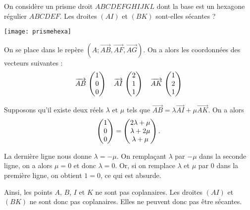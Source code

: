 \documentclass[11pt,fleqn, openany]{book} %
\begin{document}
\begin{exercise}[topic=geo05]On considère un prisme droit $ABCDEFGHIJKL$ dont la base est un hexagone régulier $ABCDEF$. Les droites $(AI)$ et $(BK)$ sont-elles sécantes ?
 \begin{center}
\texttt{[image: prismehexa]}
\end{center}
\end{exercise}
\begin{solution}
On se place dans le repère $(A;\overrightarrow{AB},\overrightarrow{AF},\overrightarrow{AG})$. On a alors les coordonnées des vecteurs suivantes :
\[ \coorde{AB}{1}{0}{0} \quad \coorde{AI}{2}{1}{1} \quad \coorde{AK}{1}{2}{1}\]

Supposons qu'il existe deux réels $\lambda$ et $\mu$ tels que $\overrightarrow{AB}=\lambda \overrightarrow{AI}+\mu \overrightarrow{AK}$. On a alors
\[ \coordbe{1}{0}{0}=\coordbe{2\lambda + \mu}{\lambda + 2\mu}{\lambda + \mu}.\]

La dernière ligne nous donne $\lambda = -\mu$. On remplaçant $\lambda$ par $-\mu$ dans la seconde ligne, on a alors $\mu=0$ et donc $\lambda = 0$. Or, si on remplace $\lambda$ et $\mu$ par 0 dans la première ligne, on obtient $1=0$, ce qui est absurde.

Ainsi, les points $A$, $B$, $I$ et $K$ ne sont pas coplanaires. Les droites $(AI)$ et $(BK)$ ne sont donc pas coplanaires. Elles ne peuvent donc pas être sécantes.\end{solution}
\end{document}
